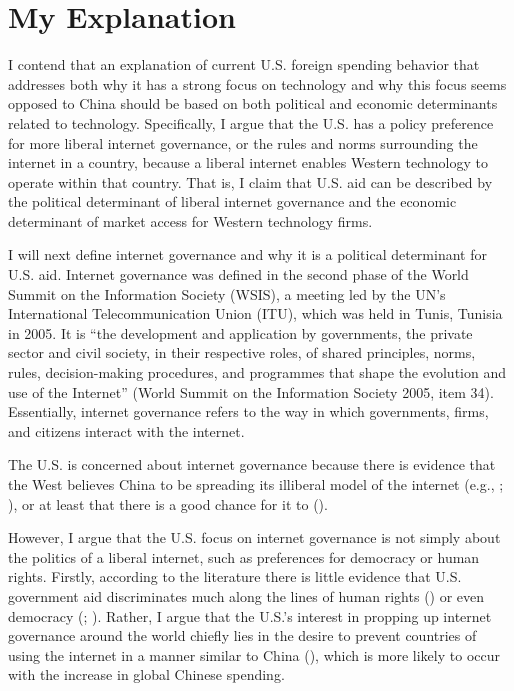 \documentclass[12pt]{article}
\begin{document}
\section*{My Explanation}
I contend that an explanation of current U.S. foreign spending behavior that addresses both why it has a strong focus on technology and why this focus seems opposed to China should be based on both political and economic determinants related to technology. Specifically, I argue that the U.S. has a policy preference for more liberal internet governance, or the rules and norms surrounding the internet in a country,  because a liberal internet enables Western technology to operate within that country. That is, I claim that U.S. aid can be described by the political determinant of liberal internet governance and the economic determinant of market access for Western technology firms. 

I will next define internet governance and why it is a political determinant for U.S. aid. Internet governance was defined in the second phase of the World Summit on the Information Society (WSIS), a meeting led by the UN's International Telecommunication Union (ITU), which was held in Tunis, Tunisia in 2005. It is ``the development and application by governments, the private sector and civil society, in their respective roles, of shared principles, norms, rules, decision-making procedures, and programmes that shape the evolution and use of the Internet'' \nocite{worldsummitontheinformationsociety2005} (World Summit on the Information Society 2005, item 34). Essentially, internet governance refers to the way in which governments, firms, and citizens interact with the internet.

The U.S. is concerned about internet governance because there is evidence that the West believes China to be spreading its illiberal model of the internet (e.g., \cite{hillman2021}; \cite{u.s.departmentofstate2022}), or at least that there is a good chance for it to (\cite{triolo2020}).

However, I argue that the U.S. focus on internet governance is not simply about the politics of a liberal internet, such as preferences for democracy or human rights. Firstly, according to the literature there is little evidence that U.S. government aid discriminates much along the lines of human rights (\cite{hoeffler2011}) or even democracy (\cite{alesina2000}; \cite{hoeffler2011}). Rather, I argue that the U.S.'s interest in propping up internet governance around the world chiefly lies in the desire to prevent countries of using the internet in a manner similar to China (\cite{hass2021}), which is more likely to occur with the increase in global Chinese spending.
\end{document}
